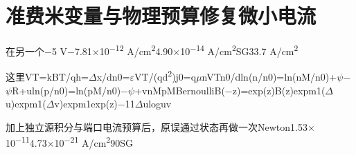 \documentclass[11pt,a4paper]{article}
\begin{document}
\section{{\cjkfont 准费米变量与物理预算修复微小电流}\allowbreak{}}\label{sec:51}
{\cjkfont 在另一个}\allowbreak{}−5 V\allowbreak{}−7.81\ensuremath{\times}10\textsuperscript{−12} A/cm\textsuperscript{2}\allowbreak{}4.90\ensuremath{\times}10\textsuperscript{−14} A/cm\textsuperscript{2}\allowbreak{}SG\allowbreak{}33.7 A/cm\textsuperscript{2}\allowbreak{}
\par
{\cjkfont 这里}\allowbreak{}VT=\allowbreak{}kBT/q\allowbreak{}h=\allowbreak{}\ensuremath{\Delta}x/d\allowbreak{}n0=\allowbreak{}\ensuremath{\varepsilon}VT/(qd\textsuperscript{2})\allowbreak{}j0=\allowbreak{}q\ensuremath{\mu}nVTn0/d\allowbreak{}ln(n/n0)=\allowbreak{}ln(nM/n0)+\ensuremath{\psi}−\ensuremath{\psi}R+u\allowbreak{}ln(p/n0)=\allowbreak{}ln(pM/n0)−\ensuremath{\psi}+v\allowbreak{}nM\allowbreak{}pM\allowbreak{}Bernoulli\allowbreak{}B(−z)=\allowbreak{}exp(z)B(z)\allowbreak{}expm1(\ensuremath{\Delta}u)\allowbreak{}expm1(\ensuremath{\Delta}v)\allowbreak{}expm1\allowbreak{}exp(z)−1\allowbreak{}1\allowbreak{}\ensuremath{\Delta}u\allowbreak{}log\allowbreak{}u\allowbreak{}v\allowbreak{}
\par
{\cjkfont 加上独立源积分与端口电流预算后，原误通过状态再做一次}\allowbreak{}Newton\allowbreak{}1.53\ensuremath{\times}10\textsuperscript{−11}\allowbreak{}4.73\ensuremath{\times}10\textsuperscript{−21} A/cm\textsuperscript{2}\allowbreak{}90\allowbreak{}SG\allowbreak{}
\end{document}
